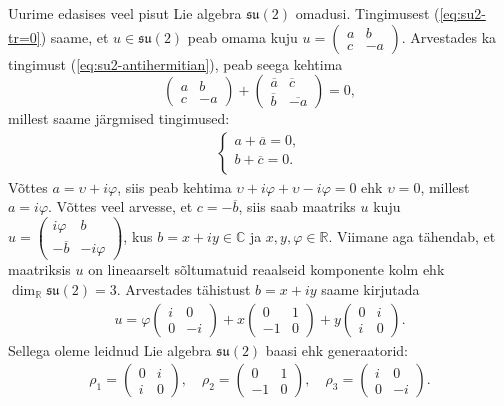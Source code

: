\documentclass[12pt,a4paper,oneside]{article}
\theoremstyle{plain}
\theoremstyle{definition}
\numberwithin{equation}{section}
\def\R{{\mathbb R}}
\def\C{{\mathbb C}}
\def\su2{{\mathfrak{ su}\left(2\right)}}
\begin{document}
Uurime edasises veel pisut Lie algebra $\su2$ omadusi. Tingimusest 
(\ref{eq:su2-tr=0}) saame, et $u \in \su2$ peab omama kuju 
$u = \begin{pmatrix} a & b \\ c & -a\end{pmatrix}$. Arvestades ka 
tingimust (\ref{eq:su2-antihermitian}), peab seega kehtima
\[\begin{pmatrix} a & b \\ c & -a\end{pmatrix} + \begin{pmatrix} 
\overline{a} & \overline{c} \\ \overline{b} & \overline{-a} 
\end{pmatrix} = 0,\]
millest saame järgmised tingimused:
\begin{align*}
\begin{cases}
    a + \overline{a} = 0, \\
    b + \overline{c} = 0. \\
  \end{cases}
\end{align*}
Võttes $a = \upsilon + i\varphi$, siis peab kehtima 
$\upsilon + i\varphi + \upsilon - i\varphi = 0$ ehk $\upsilon = 0$, 
millest $a = i\varphi$. Võttes veel arvesse, et $c = -\overline{b}$, 
siis saab maatriks $u$ kuju $u = \begin{pmatrix} i\varphi & b \\ 
-\overline{b} & -i\varphi \end{pmatrix}$, kus $b=x+iy \in \C$ ja 
$x, y, \varphi \in \R$. Viimane aga tähendab, et maatriksis $u$ 
on lineaarselt sõltumatuid reaalseid komponente kolm ehk 
$\dim_{\R} \su2 = 3$. Arvestades tähistust $b = x + iy$ saame 
kirjutada
\begin{align*}
u = \varphi \begin{pmatrix} i & 0 \\ 0 & -i \end{pmatrix} + 
x \begin{pmatrix} 0 & 1 \\ -1 & 0 \end{pmatrix} + 
y \begin{pmatrix} 0 & i \\ i & 0 \end{pmatrix}.
\end{align*}
Sellega oleme leidnud Lie algebra $\su2$ baasi ehk generaatorid:
\begin{align*}
\rho_1 = \begin{pmatrix} 0 & i \\ i & 0 \end{pmatrix},\quad \rho_2 = 
\begin{pmatrix} 0 & 1 \\ -1 & 0 \end{pmatrix},\quad \rho_3 = 
\begin{pmatrix} i & 0 \\ 0 & -i \end{pmatrix}.
\end{align*}
\end{document}
